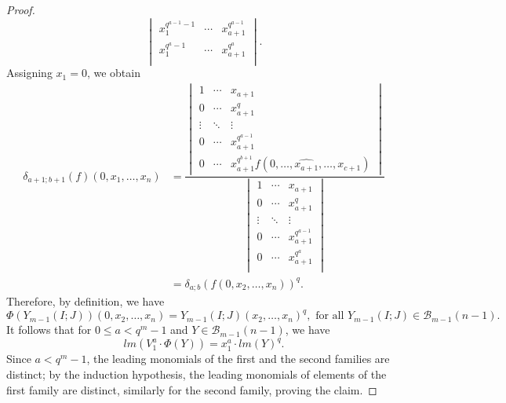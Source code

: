 \documentclass[12pt,a4paper]{report}
\theoremstyle{definition}
\theoremstyle{remark}
\theoremstyle{definition}
\begin{document}
\begin{proof}
\begin{equation*}
{\begin{vmatrix}
            x_1^{q^{a-1}-1} & \cdots  & x_{a+1}^{q^{a-1}}\\
            x_1^{q^{a}-1} & \cdots  & x_{a+1}^{q^{a}}\\
        \end{vmatrix}}. 
    \end{equation*}
    Assigning $x_1=0$, we obtain
    \begin{align*}
        \delta_{a+1;b+1}(f)(0, x_1, \ldots, x_n)&= \dfrac{\begin{vmatrix}
            1 & \cdots & x_{a+1}\\
            0 & \cdots & x_{a+1}^q\\
            \vdots & \ddots & \vdots\\
            0 & \cdots  & x_{a+1}^{q^{a-1}}\\
            0 & \cdots  & x_{a+1}^{q^{b+1}}f(0, \ldots, \widehat{x_{a+1}}, \ldots, x_{c+1})
        \end{vmatrix}}{\begin{vmatrix}
            1 & \cdots & x_{a+1}\\
            0 & \cdots & x_{a+1}^q\\
            \vdots & \ddots & \vdots\\
            0 & \cdots  & x_{a+1}^{q^{a-1}}\\
            0 & \cdots  & x_{a+1}^{q^{a}}\\
        \end{vmatrix}}\\
        &=\delta_{a;b}(f(0, x_2, \ldots, x_n))^q.
    \end{align*}
    Therefore, by definition, we have
    \begin{equation*}
        \Phi(Y_{m-1}(I;J))(0, x_2, \ldots, x_n) = Y_{m-1}(I; J)(x_2, \ldots, x_n)^q, \text{ for all } Y_{m-1}(I; J)\in \mathcal{B}_{m-1}(n-1). 
    \end{equation*}
    It follows that for $0\leq a<q^m-1$ and $Y\in \mathcal{B}_{m-1}(n-1)$, we have
    \begin{equation*}
        lm(V_1^a \cdot \Phi(Y)) = x_1^a \cdot lm(Y)^q.
    \end{equation*}
    Since $a<q^m-1$, the leading monomials of the first and the second families are distinct; by the induction hypothesis, the leading monomials of elements of the first family are distinct, similarly for the second family, proving the claim.
\end{proof}
\end{document}

